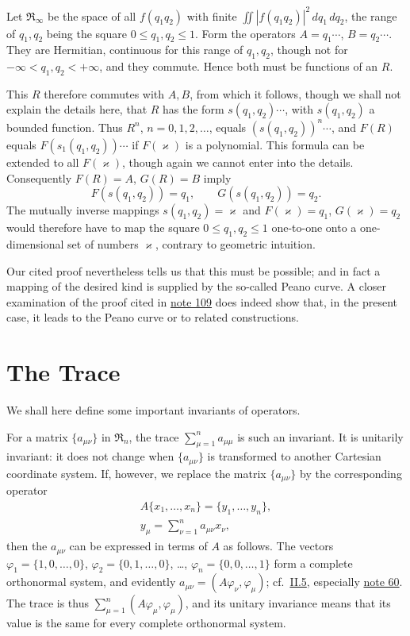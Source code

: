 \documentclass[fontsize=13pt,twoside,openany,headings=normal,parskip=false,bookmarkpackage=false,DIV=calc]{scrbook}
\begin{document}
Let $\mathfrak R_\infty$ be the space of all $f(q_1q_2)$ with finite $\iint|f(q_1q_2)|^2\,dq_1\,dq_2$, the range of $q_1,q_2$ being the square $0\leq q_1,q_2\leq1$. Form the operators $A=q_1\cdots$, $B=q_2\cdots$. They are Hermitian, continuous for this range of $q_1,q_2$, though not for $-\infty<q_1,q_2<+\infty$, and they commute. Hence both must be functions of an $R$.

\hypertarget{origpage-93}{}%
This $R$ therefore commutes with $A,B$, from which it follows, though we shall not explain the details here, that $R$ has the form $s(q_1,q_2)\cdots$, with $s(q_1,q_2)$ a bounded function. Thus $R^n$, $n=0,1,2,\ldots$, equals $(s(q_1,q_2))^n\cdots$, and $F(R)$ equals $F(s_1(q_1,q_2))\cdots$ if $F(\varkappa)$ is a polynomial.  This formula can be extended to all $F(\varkappa)$, though again we cannot enter into the details. Consequently $F(R)=A$, $G(R)=B$ imply
\[
F(s(q_1,q_2))=q_1,\qquad G(s(q_1,q_2))=q_2.
\]
The mutually inverse mappings $s(q_1,q_2)=\varkappa$ and $F(\varkappa)=q_1$, $G(\varkappa)=q_2$ would therefore have to map the square $0\leq q_1,q_2\leq1$ one-to-one onto a one-dimensional set of numbers $\varkappa$, contrary to geometric intuition.

Our cited proof nevertheless tells us that this must be possible; and in fact a mapping of the desired kind is supplied by the so-called Peano curve. A closer examination of the proof cited in \hyperlink{note-109}{note 109} does indeed show that, in the present case, it leads to the Peano curve or to related constructions.

\section{The Trace}\label{sec:II.11}
We shall here define some important invariants of operators.

For a matrix $\{a_{\mu\nu}\}$ in $\mathfrak R_n$, the trace $\sum_{\mu=1}^n a_{\mu\mu}$ is such an invariant. It is unitarily invariant: it does not change when $\{a_{\mu\nu}\}$ is transformed to another Cartesian coordinate system. If, however, we replace the matrix $\{a_{\mu\nu}\}$ by the corresponding operator
\begin{gather*}
A\{x_1,\ldots,x_n\}=\{y_1,\ldots,y_n\},\\
y_\mu=\sum_{\nu=1}^n a_{\mu\nu}x_\nu,
\end{gather*}
then the $a_{\mu\nu}$ can be expressed in terms of $A$ as follows. The vectors $\varphi_1=\{1,0,\ldots,0\}$, $\varphi_2=\{0,1,\ldots,0\}$, \ldots, $\varphi_n=\{0,0,\ldots,1\}$ form a complete orthonormal system, and evidently $a_{\mu\nu}=(A\varphi_\nu,\varphi_\mu)$; cf.\ \hyperref[sec:II.5]{II.5}, especially \hyperlink{note-60}{note 60}. The trace is thus $\sum_{\mu=1}^n(A\varphi_\mu,\varphi_\mu)$, and its unitary invariance means that its value is the same for every complete orthonormal system.
\end{document}
